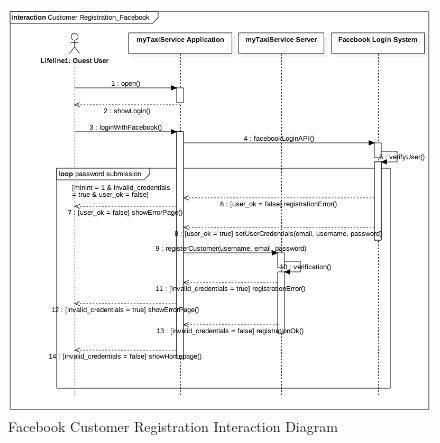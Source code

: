 				\begin{figure}[H]
					\centering
					\includegraphics[width=\textwidth, scale=0.5]{IMG/InteractionDiagrams/CustomerRegistration_Facebook.png}
					\caption{Facebook Customer Registration Interaction Diagram}\label{sec:FigureCustomerRegistration_Facebook}
				\end{figure}